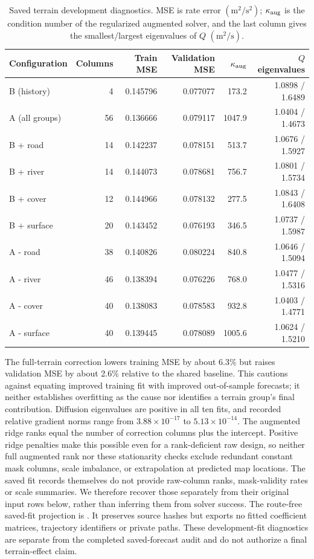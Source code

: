 \begin{table}[htbp]
\centering\footnotesize
\caption{Saved terrain development diagnostics. MSE is rate error
\((\mathrm{m}^2/\mathrm{s}^2)\); \(\kappa_{\rm aug}\) is the condition
number of the regularized augmented solver, and the last column gives the
smallest/largest eigenvalues of \(Q\) \((\mathrm{m}^2/\mathrm{s})\).}
\label{tab:terrain-fit-diagnostics}\hypertarget{tab:terrain-fit-diagnostics}{}
\begin{tabular}{lrrrrr}
\toprule
Configuration & Columns & Train MSE & Validation MSE & \(\kappa_{\rm aug}\) & \(Q\) eigenvalues\\
\midrule
B (history) & 4 & 0.145796 & 0.077077 & 173.2 & 1.0898 / 1.6489\\
A (all groups) & 56 & 0.136666 & 0.079117 & 1047.9 & 1.0404 / 1.4673\\
B + road & 14 & 0.142237 & 0.078151 & 513.7 & 1.0676 / 1.5927\\
B + river & 14 & 0.144073 & 0.078681 & 756.7 & 1.0801 / 1.5734\\
B + cover & 12 & 0.144966 & 0.078132 & 277.5 & 1.0843 / 1.6408\\
B + surface & 20 & 0.143452 & 0.076193 & 346.5 & 1.0737 / 1.5987\\
A - road & 38 & 0.140826 & 0.080224 & 840.8 & 1.0646 / 1.5094\\
A - river & 46 & 0.138394 & 0.076226 & 768.0 & 1.0477 / 1.5316\\
A - cover & 40 & 0.138083 & 0.078583 & 932.8 & 1.0403 / 1.4771\\
A - surface & 40 & 0.139445 & 0.078089 & 1005.6 & 1.0624 / 1.5210\\
\bottomrule
\end{tabular}
\end{table}

The full-terrain correction lowers training MSE by about 6.3\% but raises
validation MSE by about 2.6\% relative to the shared baseline. This cautions
against equating improved training fit with improved out-of-sample forecasts;
it neither establishes overfitting as the cause nor identifies a terrain
group's final contribution. Diffusion eigenvalues are positive in all ten
fits, and recorded relative gradient norms range from
\(3.88\times10^{-17}\) to \(5.13\times10^{-14}\). The augmented ridge ranks
equal the number of correction columns plus the intercept. Positive ridge
penalties make this possible even for a rank-deficient raw design, so neither
full augmented rank nor these stationarity checks exclude redundant constant
mask columns, scale imbalance, or extrapolation at predicted map locations.
The saved fit records themselves do not provide raw-column ranks, mask-validity
rates or scale summaries. We therefore recover those separately from their
original input rows below, rather than inferring them from solver success.
The route-free saved-fit projection is
. It preserves source hashes but
exports no fitted coefficient matrices, trajectory identifiers or private
paths. These development-fit diagnostics are separate from the completed
saved-forecast audit and do not authorize a final terrain-effect claim.

